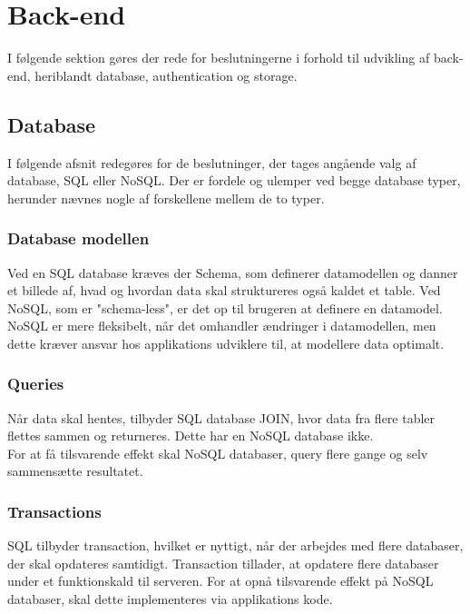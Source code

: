 \section{Back-end}
I følgende sektion gøres der rede for beslutningerne i forhold til udvikling af back-end, heriblandt database, authentication og storage.

\subsection{Database}
I følgende afsnit redegøres for de beslutninger, der tages angående valg af database, SQL\cite{SQL} eller NoSQL\cite{NoSQL}.
Der er fordele og ulemper ved begge database typer, herunder nævnes nogle af forskellene mellem de to typer.

\subsubsection{Database modellen}

Ved en SQL database kræves der Schema\cite{Schema}, som definerer datamodellen og danner et billede af, hvad og hvordan data skal struktureres også kaldet et table. Ved NoSQL, som er "schema-less", er det op til brugeren at definere en datamodel. NoSQL er mere fleksibelt, når det omhandler ændringer i datamodellen, men dette kræver ansvar hos applikations udviklere til, at modellere data optimalt.

\subsubsection{Queries\cite{Query}}
Når data skal hentes, tilbyder SQL database JOIN\cite{JOIN}, hvor data fra flere tabler flettes sammen og returneres. Dette har en NoSQL database ikke. \\
For at få tilsvarende effekt skal NoSQL databaser, query flere gange og selv sammensætte resultatet.

\subsubsection{Transactions\cite{Transactions}}
 SQL tilbyder transaction, hvilket er nyttigt, når der arbejdes med flere databaser, der skal opdateres samtidigt. Transaction tillader, at opdatere flere databaser under et funktionskald til serveren. For at opnå tilsvarende effekt på NoSQL databaser, skal dette implementeres via applikations kode. 

